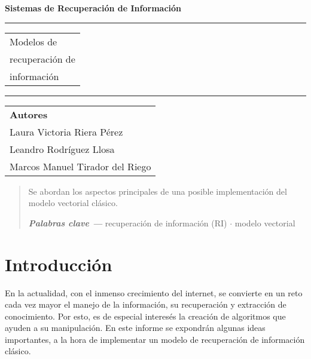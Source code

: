 \documentclass{llncs}
\providecommand{\keywords}[1]
{
	\small	
	\textbf{\textit{Palabras clave --- }} #1
}
\begin{document}
\thispagestyle{empty}
\begin{flushleft}
\LARGE\bfseries Sistemas de Recuperaci\'on de Informaci\'on\\[2cm]
\end{flushleft}
\rule{\textwidth}{1pt}
\vspace{2pt}
\begin{flushright}
\Huge
\begin{tabular}{@{}l}
Modelos de\\ 
recuperaci\'on de\\ 
informaci\'on\\[6pt]
\end{tabular}
\end{flushright}
\rule{\textwidth}{1pt}
\vfill
\begin{flushleft}
\large\itshape
\begin{tabular}{@{}l}
{\large\upshape\bfseries Autores}\\[8pt]
Laura Victoria Riera P\'erez\\[5pt]
Leandro Rodr\'iguez Llosa\\[5pt]
Marcos Manuel Tirador del Riego
\end{tabular}
\end{flushleft}

\newpage
{}
	\begin{abstract}
	   Se abordan los aspectos principales de una posible implementaci\'on del modelo vectorial cl\'asico.
 
	\vspace{1em}
	\keywords{recuperaci\'on de informaci\'on (RI) \textbf{$\cdot$} modelo vectorial}
\end{abstract} 
\thispagestyle{empty}


\newpage
{}
\tableofcontents
\thispagestyle{empty}

\newpage
{}

\section{Introducci\'on}

    En la actualidad, con el inmenso crecimiento del internet, se convierte en un reto cada vez mayor el manejo de la información, su recuperaci\'on y extracci\'on de conocimiento. Por esto, es de especial interes\'es la creaci\'on de algoritmos que ayuden a su manipulaci\'on. En este informe se expondr\'an algunas ideas importantes, a la hora de implementar un modelo de recuperaci\'on de informaci\'on cl\'asico.
\end{document}

